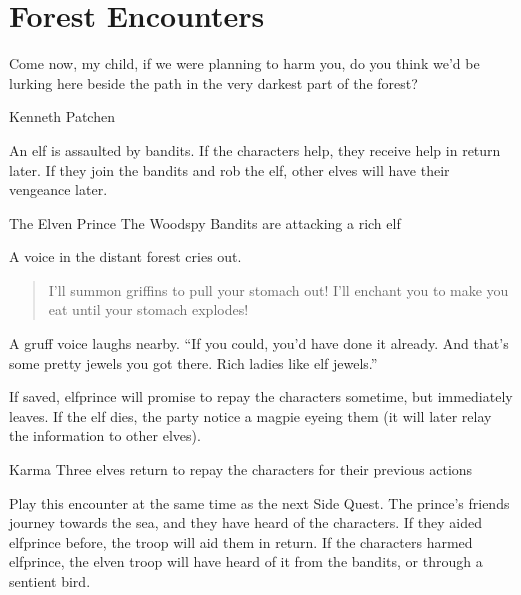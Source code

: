 \section{Forest Encounters}

\epigraph{Come now, my child, if we were planning to harm you, do you think we'd be lurking here beside the path in the very darkest part of the forest?}{Kenneth Patchen}

\renewcommand{\sqarea}{Forest}

\setcounter{enc}{0}

\begin{multicols}{2}

\label{littleprince}

\startcontents[sq]

\sqminitoc

\noindent
An elf is assaulted by bandits.
If the characters help, they receive help in return later.
If they join the bandits and rob the elf, other elves will have their vengeance later.

{The Elven Prince}%
{The Woodspy Bandits are attacking a rich elf}%

\begin{boxtext}
  A voice in the distant forest cries out.
  \begin{quote}
    I'll summon griffins to pull your stomach out!  I'll enchant you to make you eat until your stomach explodes!
  \end{quote}

  A gruff voice laughs nearby.  ``If you could, you'd have done it already.  And that's some pretty jewels you got there.  Rich ladies like elf jewels.''

\end{boxtext}


\elfprince

If saved, \gls{elfprince} will promise to repay the characters sometime, but immediately leaves.
If the elf dies, the party notice a magpie eyeing them (it will later relay the information to other elves).

{\squash Karma}%
{Three elves return to repay the characters for their previous actions}%

Play this encounter at the same time as the next Side Quest.
The prince's friends journey towards the sea, and they have heard of the characters.
If they aided \gls{elfprince} before, the troop will aid them in return.
If the characters harmed \gls{elfprince}, the elven troop will have heard of it from the bandits, or through a sentient bird.


\end{multicols}

